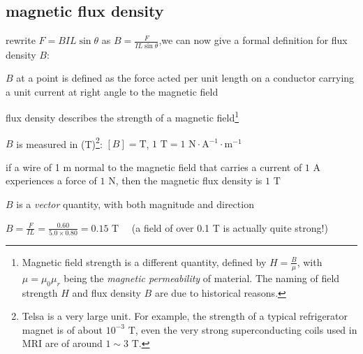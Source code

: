 \subsection{magnetic flux density} \label{sec:magnetic_flux_density}

rewrite $F=BIL\sin\theta$ as $B = \frac{F}{IL\sin\theta}$,we can now give a formal definition for flux density $B$:

\begin{ilight}
	 $B$ at a point is defined as the force acted per unit length on a conductor carrying a unit current at right angle to the magnetic field
\end{ilight}

\cmt flux density describes the strength of a magnetic field\footnote{Magnetic field strength is a different quantity, defined by $H=\frac{B}{\mu}$, with $\mu=\mu_0\mu_r$ being the \emph{magnetic permeability} of material. The naming of field strength $H$ and flux density $B$ are due to historical reasons.}

\cmt $B$ is measured in  (T)\footnote{Telsa is a very large unit. For example, the strength of a typical refrigerator magnet is of about $10^{-3} \text{ T}$, even the very strong superconducting coils used in MRI are of around $1\sim3 \text{ T}$.}: $[B]=\text{T}$, $1 \text{ T} = 1 \text{ N}\cdot\text{A}^{-1}\cdot\text{m}^{-1}$

\begin{ilight}
	if a wire of 1 m normal to the magnetic field that carries a current of $1\text{ A}$ experiences a force of $1\text{ N}$, then the magnetic flux density is $1\text{ T}$
\end{ilight}

\cmt $B$ is a \emph{vector} quantity, with both magnitude and direction


	
\sol $B=\frac{F}{IL} = \frac{0.60}{5.0\times0.80} = 0.15 \text{ T} \quad $ (a field of over 0.1 T is actually quite strong!) \eoe


\newpage
{}

